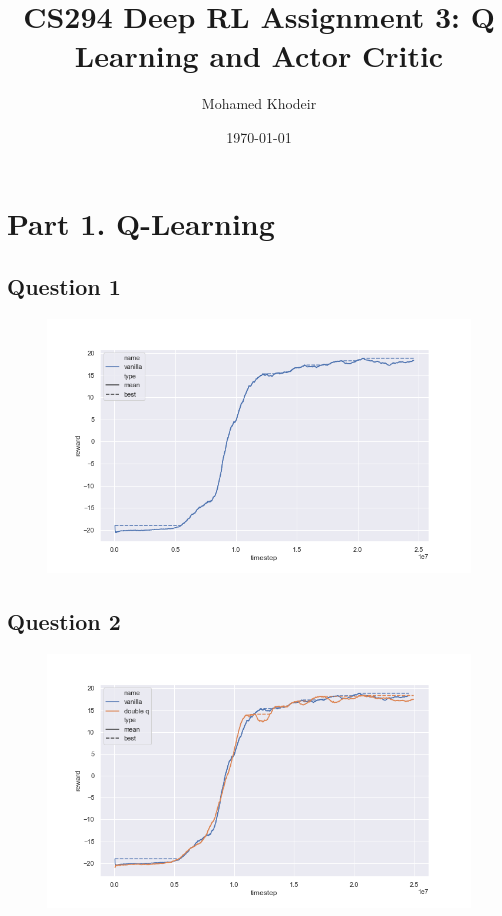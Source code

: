 \documentclass[a4paper]{article}
\title{CS294 Deep RL Assignment 3: Q Learning and Actor Critic}
\author{Mohamed Khodeir}
\date{\today}
\begin{document}
\maketitle


\section*{Part 1. Q-Learning}
\subsection*{Question 1}
\begin{figure}[H]
\centering
\includegraphics[width=1\textwidth]{p1q1.png}
\end{figure}


\subsection*{Question 2}
\begin{figure}[H]
\centering
\includegraphics[width=1\textwidth]{p1q2.png}
\end{figure}
\end{document}
